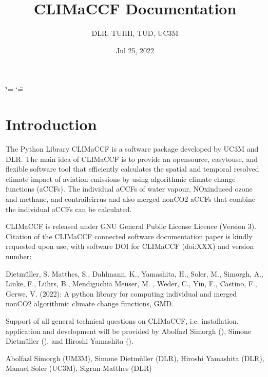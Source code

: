 \documentclass[a4paper,11pt,english]{sphinxmanual}
\title{CLIMaCCF Documentation}
\date{Jul 25, 2022}
\author{DLR, TUHH, TUD, UC3M}
\begin{document}
\ifdefined\shorthandoff
  \ifnum\catcode`\=\string=\active\shorthandoff{=}\fi
  \ifnum\catcode`\"=\active{}\fi
\fi

\pagestyle{empty}
\sphinxmaketitle
\pagestyle{plain}
\sphinxtableofcontents
\pagestyle{normal}
\label{\detokenize{index::doc}}



\chapter{Introduction}
\label{\detokenize{index:introduction}}
\sphinxAtStartPar
{} The Python Library CLIMaCCF is a software package developed by UC3M and DLR. The main idea of CLIMaCCF is to provide an open\sphinxhyphen{}source, easy\sphinxhyphen{}to\sphinxhyphen{}use, and flexible software tool that efficiently calculates the spatial and temporal resolved climate impact of aviation emissions by using algorithmic climate change functions (aCCFs). The individual aCCFs of water vapour, NOx\sphinxhyphen{}induced ozone and methane, and contrail\sphinxhyphen{}cirrus and also merged non\sphinxhyphen{}CO2 aCCFs that combine the individual aCCFs can be calculated.

\sphinxAtStartPar
{} CLIMaCCF is released under GNU General Public License Licence (Version 3). Citation of the CLIMaCCF connected software documentation paper is kindly requested upon use, with software DOI for CLIMaCCF (doi:XXX) and version number:

\sphinxAtStartPar
{} Dietmüller, S. Matthes, S., Dahlmann, K., Yamashita, H., Soler, M., Simorgh, A., Linke, F., Lührs, B., Mendiguchia Meuser, M. , Weder, C., Yin, F., Castino, F., Gerwe, V. (2022): A python library for computing individual and merged non\sphinxhyphen{}CO2 algorithmic climate change functions, GMD.

\sphinxAtStartPar
{} Support of all general technical questions on CLIMaCCF, i.e. installation, application and development will be provided by Abolfazl Simorgh (), Simone Dietmüller (), and Hiroshi Yamashita ().

\sphinxAtStartPar
{} Abolfazl Simorgh (UM3M), Simone Dietmüller (DLR), Hiroshi Yamashita (DLR), Manuel Soler (UC3M), Sigrun Matthes (DLR)
\end{document}
